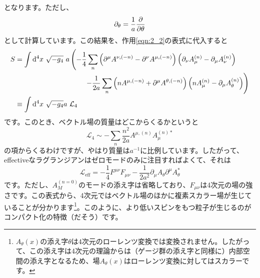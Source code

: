 \documentclass[unicode,a4paper,10pt]{ltjsarticle}
\begin{document}
となります。ただし、
\begin{equation}
   \partial_{\theta}
   =
   \frac{1}{a}\pdv{}{\theta}
\end{equation}
として計算しています。この結果を、作用\eqref{eqn:2_2}の表式に代入すると
\begin{align}
   S
   &=
   \int\dd^4 x\ \sqrt{-g_{4}}\ 
   a
   \left(  
      -
      \frac{1}{4}
      \sum_{n}
      \left(  
         \partial^{\mu}A^{\nu,(-n)}
         -
         \partial^{\nu}A^{\mu,(-n)}
      \right)
      \left(  
         \partial_{\nu}A_{\mu}^{(n)}
         -
         \partial_{\mu}A_{\nu}^{(n)}
      \right)  
   \right.
   \nonumber
   \\
   &\hspace*{3.5cm}
   \left. 
      -
      \frac{1}{2a}   
      \sum_{n}
      \left(  
         nA^{\mu,(-n)}+\partial^{\mu}A^{\theta,(-n)}
      \right)
      \left(  
         nA_{\mu}^{(n)}-\partial_{\mu}A_{\theta}^{(n)}
      \right)   
   \right)
   \\
   &\equiv
   \int\dd^4 x\ \sqrt{-g_{4}}a\ \mathcal{L}_{4}
   \nonumber
\end{align}
です。このとき、ベクトル場の質量はどこからくるかというと
\begin{equation}
   \mathcal{L}_{4}
   \sim
   -\sum_{n}\frac{n^2}{2a}A^{\mu, (n)}A_{\mu}^{(n)\ast}
\end{equation}
の項からくるわけですが、やはり質量は$a^{-1}$に比例しています。したがって、effectiveなラグランジアンはゼロモードのみに注目すればよくて、それは
\begin{equation}
   \mathcal{L}_{\mathrm{eff}}
   =
   -\frac{1}{4}F^{\mu\nu}F_{\mu\nu}
   -\frac{1}{2a^2}\partial_{\mu}A_{\theta}\partial^{\mu}A_{\theta}^{\ast}
\end{equation}
です。ただし、$A_{M}^{(n=0)}$のモードの添え字は省略しており、$F_{\mu\nu}$は4次元の場の強さです。この表式から、4次元ではベクトル場のほかに複素スカラー場が生じていることが分かります\footnote{
   $A_{\theta}(x)$の添え字$\theta$は$4$次元のローレンツ変換では変換されません。したがって、この添え字は4次元の理論からは（ゲージ群の添え字と同様に）内部空間の添え字となるため、場$A_{\theta}(x)$はローレンツ変換に対してはスカラーです。
}。このように、より低いスピンをもつ粒子が生じるのがコンパクト化の特徴（だそう）です。
\end{document}
